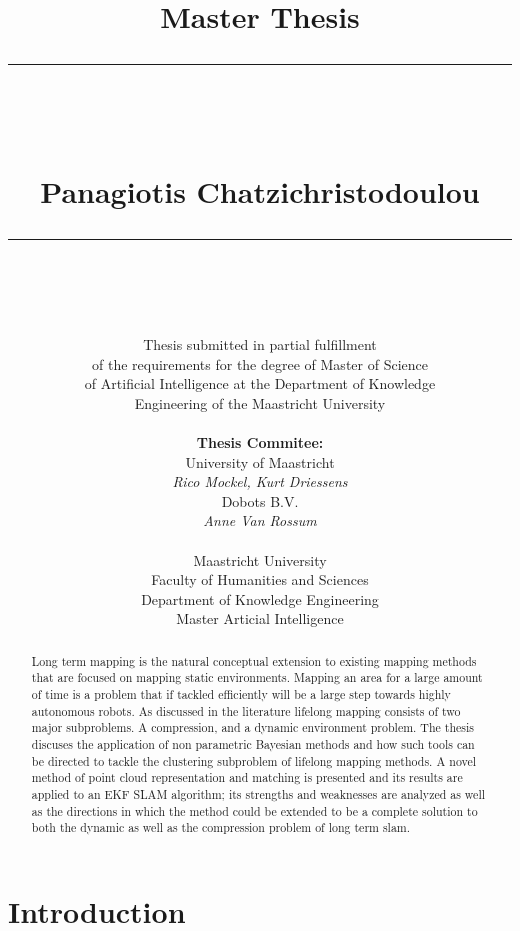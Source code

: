 \documentclass[twoside,hidelinks]{article}
\title{
\Huge{Master Thesis} \\
\noindent\rule{4cm}{0.4pt} \\
\vspace{5mm}
\huge{\selectfont{Towards lifelong mapping in pointclouds}}
\vspace{5mm} \\
\normalsize Panagiotis Chatzichristodoulou \\
\noindent\rule{4cm}{0.4pt} \\
\vspace{5mm}
\fontsize{24pt}{10pt}{Master Thesis DKE 09-16 }} %
\author{
\normalsize Thesis submitted in partial fulfillment\\
\normalsize  of the requirements for the degree of Master of Science \\
\normalsize of Artificial Intelligence at the Department of Knowledge \\
\normalsize  Engineering of the Maastricht University \\
\vspace{5mm} \\
\normalsize \textbf{Thesis Commitee:} \\ 
\normalsize University of Maastricht \\ %
\normalsize \textit{Rico Mockel, Kurt Driessens} \\
\normalsize Dobots B.V.\\
\normalsize \textit{Anne Van Rossum} \\
\vspace{0mm} \\
\normalsize Maastricht University \\
\normalsize Faculty of Humanities and Sciences \\ 
\normalsize Department of Knowledge Engineering \\
\normalsize Master Articial Intelligence \\
}
\begin{document}
\maketitle %

\thispagestyle{fancy} %

\newpage

\begin{abstract}

\noindent Long term mapping is the natural conceptual extension to existing mapping methods that are focused on mapping static environments. Mapping an area for a large amount of time is a problem that if tackled efficiently will be a large step towards highly autonomous robots. As discussed in the literature lifelong mapping consists of two major subproblems. A compression, and a dynamic environment problem. The thesis discuses the application of non parametric Bayesian methods and how such tools can be directed to tackle the clustering subproblem of lifelong mapping methods. A novel method of point cloud representation and matching is presented and its results are applied to an EKF SLAM algorithm; its strengths and weaknesses are analyzed as well as the directions in which the method could be extended to be a complete solution to both the dynamic as well as the compression problem of long term slam.


\end{abstract}

\newpage
\thispagestyle{empty}
 
\tableofcontents

\listoffigures
 
 
\newpage

\section{Introduction}
\label{sec:literature}
\end{document}
